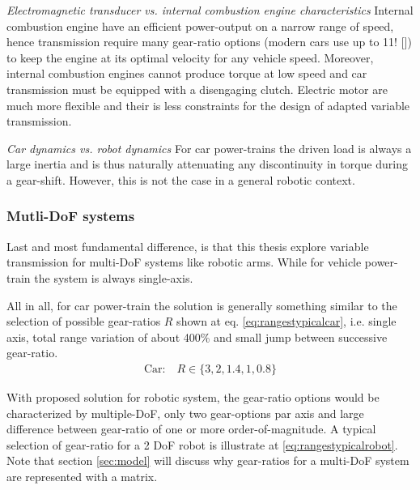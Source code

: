 \emph{Electromagnetic transducer vs. internal combustion engine characteristics }
%
Internal combustion engine have an efficient power-output on a narrow range of speed, hence transmission require many gear-ratio options (modern cars use up to 11! []) to keep the engine at its optimal velocity for any vehicle speed. Moreover, internal combustion engines cannot produce torque at low speed and car transmission must be equipped with a disengaging clutch.  Electric motor are much more flexible and their is less constraints for the design of adapted variable transmission. 

\emph{Car dynamics vs. robot dynamics }
%
For car power-trains the driven load is always a large inertia and is thus naturally attenuating any discontinuity in torque during a gear-shift. However, this is not the case in a general robotic context. 

\subsubsection{Mutli-DoF systems}

Last and most fundamental difference, is that this thesis explore variable transmission for multi-DoF systems like robotic arms. While for vehicle power-train the system is always single-axis.


All in all, for car power-train the solution is generally something similar to the selection of possible gear-ratios $R$ shown at eq. \eqref{eq:rangestypicalcar}, i.e. single axis, total range variation of about 400\% and small jump between successive gear-ratio.  
\begin{align}
	\text{Car:} \quad R \in \{3,2,1.4,1,0.8\} 
 \label{eq:rangestypicalcar}
\end{align}

With proposed solution for robotic system, the gear-ratio options would be characterized by multiple-DoF, only two gear-options par axis and large difference between gear-ratio of one or more order-of-magnitude. A typical selection of gear-ratio for a 2 DoF robot is illustrate at \eqref{eq:rangestypicalrobot}. Note that section \ref{sec:model} will discuss why gear-ratios for a multi-DoF system are represented with a matrix.

